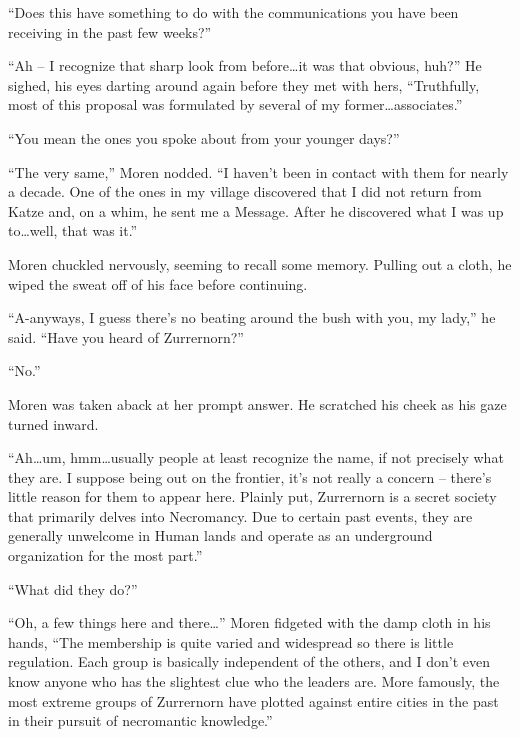 “Does this have something to do with the communications you have been receiving in the past few weeks?”

 

“Ah – I recognize that sharp look from before…it was that obvious, huh?” He sighed, his eyes darting around again before they met with hers, “Truthfully, most of this proposal was formulated by several of my former…associates.”

 

“You mean the ones you spoke about from your younger days?”

 

“The very same,” Moren nodded. “I haven’t been in contact with them for nearly a decade. One of the ones in my village discovered that I did not return from Katze and, on a whim, he sent me a Message. After he discovered what I was up to…well, that was it.”

 

Moren chuckled nervously, seeming to recall some memory. Pulling out a cloth, he wiped the sweat off of his face before continuing.

 

“A-anyways, I guess there’s no beating around the bush with you, my lady,” he said. “Have you heard of Zurrernorn?”

 

“No.”

 

Moren was taken aback at her prompt answer. He scratched his cheek as his gaze turned inward.

 

“Ah…um, hmm…usually people at least recognize the name, if not precisely what they are. I suppose being out on the frontier, it’s not really a concern – there’s little reason for them to appear here. Plainly put, Zurrernorn is a secret society that primarily delves into Necromancy. Due to certain past events, they are generally unwelcome in Human lands and operate as an underground organization for the most part.”

 

“What did they do?”

 

“Oh, a few things here and there…” Moren fidgeted with the damp cloth in his hands, “The membership is quite varied and widespread so there is little regulation. Each group is basically independent of the others, and I don’t even know anyone who has the slightest clue who the leaders are. More famously, the most extreme groups of Zurrernorn have plotted against entire cities in the past in their pursuit of necromantic knowledge.”

